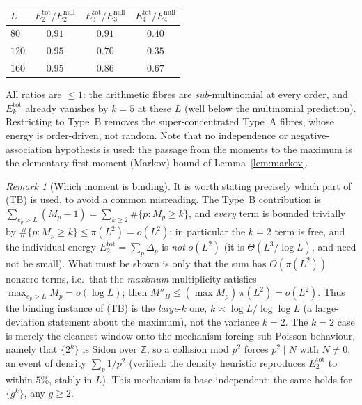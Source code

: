 \documentclass[11pt]{article}
\theoremstyle{plain}
\theoremstyle{definition}
\theoremstyle{remark}
\newtheorem{remark}[theorem]{Remark}
\newcommand{\Z}{\mathbb{Z}}
\newcommand{\ep}{e_p}
\begin{document}
\begin{center}
\begin{tabular}{lccc}
\toprule
$L$ & $E_2^{\mathrm{tot}}/E_2^{\mathrm{null}}$ & $E_3^{\mathrm{tot}}/E_3^{\mathrm{null}}$ & $E_4^{\mathrm{tot}}/E_4^{\mathrm{null}}$\\
\midrule
$80$ & $0.91$ & $0.91$ & $0.40$\\
$120$ & $0.95$ & $0.70$ & $0.35$\\
$160$ & $0.95$ & $0.86$ & $0.67$\\
\bottomrule
\end{tabular}
\end{center}

All ratios are $\le1$: the arithmetic fibres are \emph{sub}-multinomial at every
order, and $E_k^{\mathrm{tot}}$ already vanishes by $k=5$ at these $L$ (well below
the multinomial prediction). Restricting to Type~B removes the
super-concentrated Type~A fibres, whose energy is order-driven, not random. Note
that no independence or negative-association hypothesis is used: the passage from
the moments to the maximum is the elementary first-moment (Markov) bound of
Lemma~\ref{lem:markov}.

\begin{remark}[Which moment is binding]\label{rem:binding}
It is worth stating precisely which part of (TB) is used, to avoid a common
misreading. The Type~B contribution is
$\sum_{\ep>L}(M_p-1)=\sum_{k\ge2}\#\{p:M_p\ge k\}$, and \emph{every} term is
bounded trivially by $\#\{p:M_p\ge k\}\le\pi(L^2)=o(L^2)$; in particular the
$k=2$ term is free, and the individual energy $E_2^{\mathrm{tot}}=\sum_p\Delta_p$
is \emph{not} $o(L^2)$ (it is $\Theta(L^3/\log L)$, and need not be small). What
must be shown is only that the sum has $O(\pi(L^2))$ nonzero terms, i.e.\ that the
\emph{maximum} multiplicity satisfies $\max_{\ep>L}M_p=o(\log L)$; then
$M''_B\le(\max M_p)\,\pi(L^2)=o(L^2)$. Thus the binding instance of (TB) is the
\emph{large}-$k$ one, $k\asymp\log L/\log\log L$ (a large-deviation statement about
the maximum), not the variance $k=2$. The $k=2$ case is merely the cleanest window
onto the mechanism forcing sub-Poisson behaviour, namely that $\{2^k\}$ is Sidon
over $\Z$, so a collision mod $p^2$ forces $p^2\mid N$ with $N\ne0$, an event of
density $\sum_p1/p^2$ (verified: the density heuristic reproduces
$E_2^{\mathrm{tot}}$ to within $5\%$, stably in $L$). This mechanism is
base-independent: the same holds for $\{g^k\}$, any $g\ge2$.
\end{remark}
\end{document}
